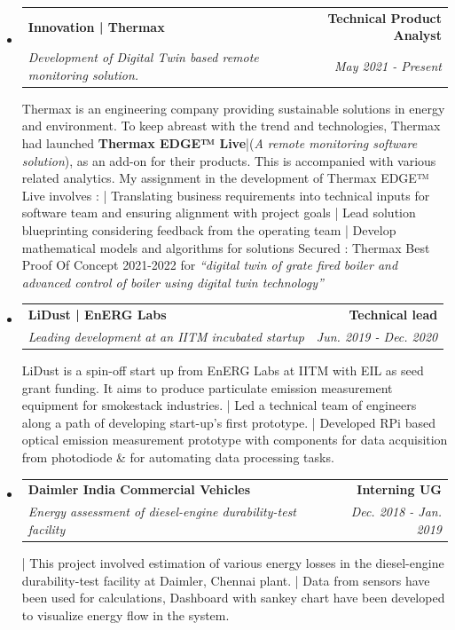 \documentclass[letterpaper,11pt]{article}
\makeatletter
\newlength{\outerbordwidth}
\newcommand{\resheading}[1]{\vspace{8pt}
  \parbox{\textwidth}{\setlength{\FrameSep}{\outerbordwidth}
    \begin{shaded}
\setlength{\fboxsep}{0pt}\framebox[\textwidth][l]{\setlength{\fboxsep}{4pt}\fcolorbox{shadecolorB}{shadecolorB}{\textbf{\sffamily{\mbox{~}\makebox[6.762in][l]{\large #1} \vphantom{p\^{E}}}}}}
    \end{shaded}
  }\vspace{-5pt}
}
\newcommand{\ressubheading}[4]{
\begin{tabular*}{6.5in}{l@{\cftdotfill{\cftsecdotsep}\extracolsep{\fill}}r}
		\textbf{#1} & \textbf{#2} \\
		\textit{#3} & \textit{#4} \\
\end{tabular*}\vspace{-6pt}}
\makeatother
\begin{document}
\resheading{Experience}
\begin{itemize}
\item 
    \ressubheading{Innovation | Thermax}{Technical Product Analyst}{Development of Digital Twin based remote monitoring solution.}{May 2021 - Present}
	\newline \newline Thermax is an engineering company providing sustainable solutions in energy and environment. To keep abreast with the trend and technologies, 
	Thermax had launched \newline \textbf{Thermax EDGE™ Live}|(\textit{A remote monitoring software solution}), as an add-on for their products. 
	This is accompanied with various related analytics. 
	\newline My assignment in the development of Thermax EDGE™ Live involves : 
	\newline | Translating business requirements into technical inputs for software team and ensuring alignment with project goals
	\newline | Lead solution blueprinting considering feedback from the operating team
	\newline | Develop mathematical models and algorithms for solutions
	\newline Secured : Thermax Best Proof Of Concept 2021-2022 for \textit{``digital twin of grate fired boiler and advanced control of boiler using digital twin technology''}
	
\item
	\ressubheading{LiDust | EnERG Labs}{Technical lead}{Leading development at an IITM incubated startup}{Jun. 2019 - Dec. 2020}
	\newline \newline LiDust is a spin-off start up from EnERG Labs at IITM with EIL as seed grant funding. 
	It aims to produce particulate emission measurement equipment for smokestack industries.
	\newline | Led a technical team of engineers along a path of developing start-up's first prototype.
	\newline | Developed RPi based optical emission measurement prototype with components for data acquisition from photodiode \& for automating data processing tasks. 
\item
	\ressubheading{Daimler India Commercial Vehicles}{Interning UG}{Energy assessment of diesel-engine durability-test facility}{Dec. 2018 - Jan. 2019}
	\newline \newline | This project involved estimation of various energy losses in the diesel-engine durability-test facility at Daimler, Chennai plant.
	\newline | Data from sensors have been used for calculations, Dashboard with sankey chart have been developed to visualize energy flow in the system.
\end{itemize}
\end{document}
